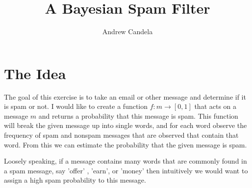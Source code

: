 \documentclass[11pt, oneside]{article}   	%
\title{A Bayesian Spam Filter}
\author{Andrew Candela}
\begin{document}
\maketitle
\section*{The Idea}
The goal of this exercise is to take an email or other message and determine if it is spam or not. I would like to create a function $f: m \rightarrow [0,1]$ that acts on a message $m$ and returns a probability that this message is spam. This function will break the given message up into single words, and for each word observe the frequency of spam and nonspam messages that are observed that contain that word. From this we can estimate the probability that the given message is spam.

Loosely speaking, if a message contains many words that are commonly found in a spam message, say 'offer' , 'earn', or 'money' then intuitively we would want to assign a high spam probability to this message.
\end{document}
